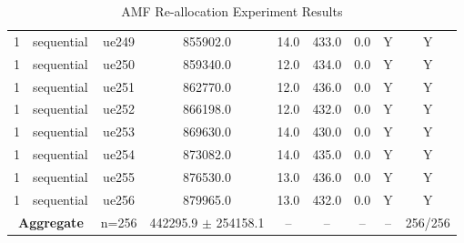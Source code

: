 \begin{table}[ht]
\begin{tabular}{|c|c|c|c|c|c|c|c|c|}
1 & sequential & ue249 & 855902.0 & 14.0 & 433.0 & 0.0 & Y & Y \\
1 & sequential & ue250 & 859340.0 & 12.0 & 434.0 & 0.0 & Y & Y \\
1 & sequential & ue251 & 862770.0 & 12.0 & 436.0 & 0.0 & Y & Y \\
1 & sequential & ue252 & 866198.0 & 12.0 & 432.0 & 0.0 & Y & Y \\
1 & sequential & ue253 & 869630.0 & 14.0 & 430.0 & 0.0 & Y & Y \\
1 & sequential & ue254 & 873082.0 & 14.0 & 435.0 & 0.0 & Y & Y \\
1 & sequential & ue255 & 876530.0 & 13.0 & 436.0 & 0.0 & Y & Y \\
1 & sequential & ue256 & 879965.0 & 13.0 & 432.0 & 0.0 & Y & Y \\
\multicolumn{2}{|c|}{\textbf{Aggregate}} & n=256 & 442295.9 $\pm$ 254158.1 & -- & -- & -- & -- & 256/256 \\
\hline
\end{tabular}
\caption{AMF Re-allocation Experiment Results}
\label{tab:amf_realloc}
\end{table}
